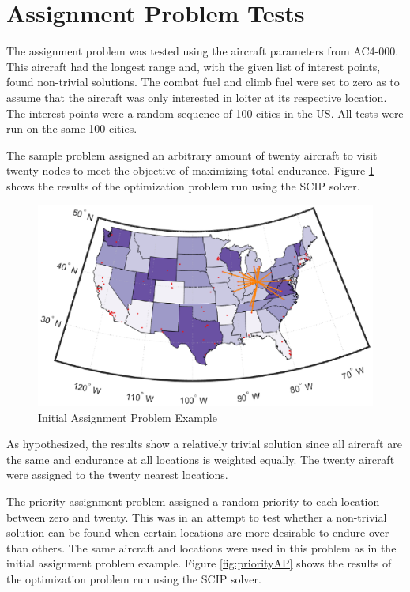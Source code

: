 \section{Assignment Problem Tests}
The assignment problem was tested using the aircraft parameters from AC4-000. This aircraft had the longest range and, with the given list of interest points, found non-trivial solutions. The combat fuel and climb fuel were set to zero as to assume that the aircraft was only interested in loiter at its respective location. The interest points were a random sequence of 100 cities in the US. All tests were run on the same 100 cities. \par
The sample problem assigned an arbitrary amount of twenty aircraft to visit twenty nodes to meet the objective of maximizing total endurance. Figure \ref{fig:trivialAP} shows the results of the optimization problem run using the SCIP solver.\par
\begin{figure}[H]
    \centering
    \includegraphics{Thesis/Method_II/trivialAP.eps}
    \caption{Initial Assignment Problem Example}
    \label{fig:trivialAP}
\end{figure}
As hypothesized, the results show a relatively trivial solution since all aircraft are the same and endurance at all locations is weighted equally. The twenty aircraft were assigned to the twenty nearest locations.\par
The priority assignment problem assigned a random priority to each location between zero and twenty. This was in an attempt to test whether a non-trivial solution can be found when certain locations are more desirable to endure over than others. The same aircraft and locations were used in this problem as in the initial assignment problem example. Figure \ref{fig:priorityAP} shows the results of the optimization problem run using the SCIP solver.
